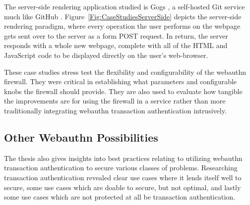 The server-side rendering application studied is Gogs \cite{TODO-gogs}, a self-hosted Git service much like GitHub \cite{TODO-github?}. Figure~\ref{Fig:CaseStudiesServerSide} depicts the server-side rendering paradigm, where every operation the user performs on the webpage gets sent over to the server as a form POST request. In return, the server responds with a whole new webpage, complete with all of the HTML and JavaScript code to be displayed directly on the user's web-browser.


These case studies stress test the flexibility and configurability of the webauthn firewall. They were critical in establishing what parameters and configurable knobs the firewall should provide. They are also used to evaluate how tangible the improvements are for using the firewall in a service rather than more traditionally integrating webauthn transaction authentication intrusively. 


\subsection{Other Webauthn Possibilities}

The thesis also gives insights into best practices relating to utilizing webauthn transaction authentication to secure various classes of problems. Researching transaction authentication revealed clear use cases where it lends itself well to secure, some use cases which are doable to secure, but not optimal, and lastly some use cases which are not protected at all be transaction authentication. 



